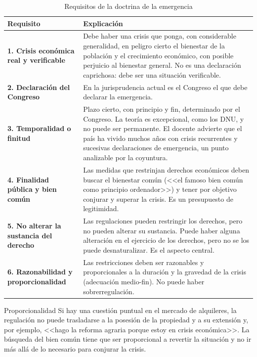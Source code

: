 \documentclass[12pt,oneside]{book}
\begin{document}
\begin{table}[H]
\centering
\caption{Requisitos de la doctrina de la emergencia}
\small
\begin{tabularx}{\textwidth}{>{\raggedright\arraybackslash}p{}>{\raggedright\arraybackslash}X}
\toprule
\textbf{Requisito} & \textbf{Explicación} \\
\midrule
\textbf{1. Crisis económica real y verificable} & Debe haber una crisis que ponga, con considerable generalidad, en peligro cierto el bienestar de la población y el crecimiento económico, con posible perjuicio al bienestar general. No es una declaración caprichosa: debe ser una situación verificable. \\
\addlinespace
\textbf{2. Declaración del Congreso} & En la jurisprudencia actual es el Congreso el que debe declarar la emergencia. \\
\addlinespace
\textbf{3. Temporalidad o finitud} & Plazo cierto, con principio y fin, determinado por el Congreso. La teoría es excepcional, como los DNU, y no puede ser permanente. El docente advierte que el país ha vivido muchos años con crisis recurrentes y sucesivas declaraciones de emergencia, un punto analizable por la coyuntura. \\
\addlinespace
\textbf{4. Finalidad pública y bien común} & Las medidas que restrinjan derechos económicos deben buscar el bienestar común (<<el famoso bien común como principio ordenador>>) y tener por objetivo conjurar y superar la crisis. Es un presupuesto de legitimidad. \\
\addlinespace
\textbf{5. No alterar la sustancia del derecho} & Las regulaciones pueden restringir los derechos, pero no pueden alterar su sustancia. Puede haber alguna alteración en el ejercicio de los derechos, pero no se los puede desnaturalizar. Es el aspecto central. \\
\addlinespace
\textbf{6. Razonabilidad y proporcionalidad} & Las restricciones deben ser razonables y proporcionales a la duración y la gravedad de la crisis (adecuación medio-fin). No puede haber sobrerregulación. \\
\bottomrule
\end{tabularx}
\end{table}

\begin{example}{Proporcionalidad}
Si hay una cuestión puntual en el mercado de alquileres, la regulación no puede trasladarse a la posesión de la propiedad y a su extensión y, por ejemplo, <<hago la reforma agraria porque estoy en crisis económica>>. La búsqueda del bien común tiene que ser proporcional a revertir la situación y no ir más allá de lo necesario para conjurar la crisis.
\end{example}
\end{document}
